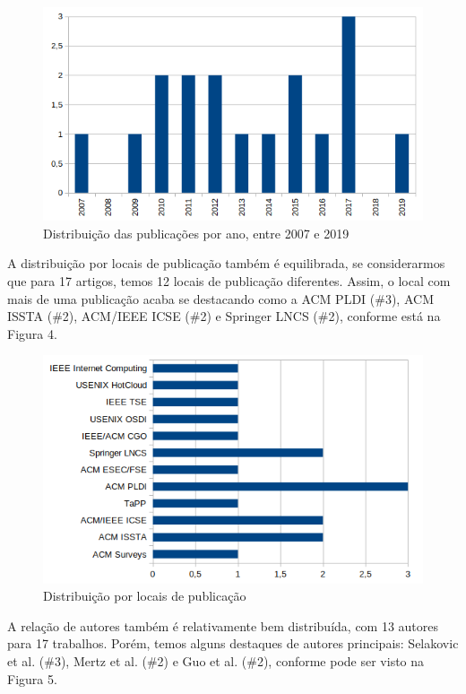 \documentclass[sigconf]{acmart}
\begin{document}
\begin{figure}[H]
  \centering
  \includegraphics[width=\linewidth]{pub_per_year}
  \caption{Distribuição das publicações por ano, entre 2007 e 2019}
\end{figure}

A distribuição por locais de publicação também é equilibrada, se considerarmos que para 17 artigos, temos 12 locais de publicação diferentes. Assim, o local com mais de uma publicação acaba se destacando como a ACM PLDI (\#3), ACM ISSTA (\#2), ACM/IEEE ICSE (\#2) e Springer LNCS (\#2), conforme está na Figura 4.

\begin{figure}[H]
  \centering
  \includegraphics[width=\linewidth]{publishers}
  \caption{Distribuição por locais de publicação}
\end{figure}

A relação de autores também é relativamente bem distribuída, com 13 autores para 17 trabalhos. Porém, temos alguns destaques de autores principais: Selakovic et al. (\#3), Mertz et al. (\#2) e Guo et al. (\#2), conforme pode ser visto na Figura 5. 
\end{document}
